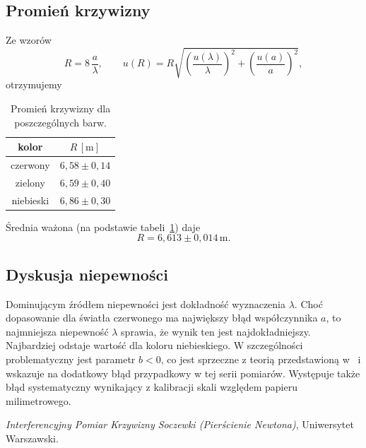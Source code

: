 \documentclass[12pt]{article}
\begin{document}
\subsection{Promień krzywizny}

Ze wzorów
\[
	R = 8\,\frac{a}{\lambda}, \qquad
	u(R) = R\sqrt{\left(\frac{u(\lambda)}{\lambda}\right)^2 + \left(\frac{u(a)}{a}\right)^2},
\]
otrzymujemy

\begin{table}[H]
	\centering
	\begin{tabular}{c|c}
		\toprule
		kolor     & \(R\,[\mathrm{m}]\)   \\
		\midrule
		czerwony  & \(6{,}58 \pm 0{,}14\) \\
		zielony   & \(6{,}59 \pm 0{,}40\) \\
		niebieski & \(6{,}86 \pm 0{,}30\) \\
		\bottomrule
	\end{tabular}
	\caption{Promień krzywizny dla poszczególnych barw.}
	\label{tab:radius}
\end{table}

Średnia ważona (na podstawie tabeli~\ref{tab:radius}) daje
\[
	R = 6{,}613 \pm 0{,}014\,\mathrm{m}.
\]

\subsection{Dyskusja niepewności}

Dominującym źródłem niepewności jest dokładność wyznaczenia \(\lambda\).
Choć dopasowanie dla światła czerwonego ma największy błąd współczynnika \(a\), to najmniejsza niepewność \(\lambda\) sprawia, że wynik ten jest najdokładniejszy.
Najbardziej odstaje wartość dla koloru niebieskiego. W szczególności problematyczny jest parametr \(b<0\), co jest sprzeczne z teorią przedstawioną w~\cite{skrypt} i wskazuje na dodatkowy błąd przypadkowy w tej serii pomiarów.
Występuje także błąd systematyczny wynikający z kalibracji skali względem papieru milimetrowego.

\newpage
\begin{thebibliography}{1}

	\emph{Interferencyjny Pomiar Krzywizny Soczewki (Pierścienie Newtona)}, Uniwersytet Warszawski.

\end{thebibliography}
\end{document}
